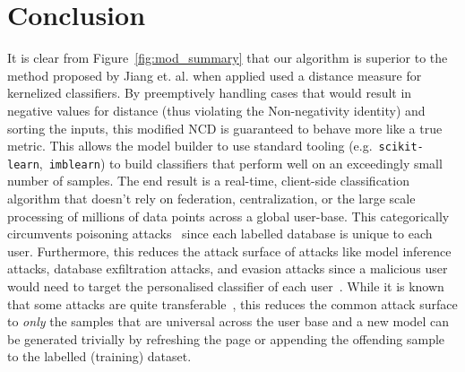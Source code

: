 \documentclass[conference]{IEEEtran}
\begin{document}
\section{Conclusion}
It is clear from Figure~\ref{fig:mod_summary} that our algorithm is superior to the method proposed by Jiang et. al. when applied used a distance measure for kernelized classifiers. By preemptively handling cases that would result in negative values for distance (thus violating the Non-negativity identity) and sorting the inputs, this modified NCD is guaranteed to behave more like a true metric. 
This allows the model builder to use standard tooling (e.g.~\texttt{scikit-learn},~\texttt{imblearn}) to build classifiers that perform well on an exceedingly small number of samples. The end result is a real-time, client-side classification algorithm that doesn't rely on federation, centralization, or the large scale processing of millions of data points across a global user-base. 
This categorically circumvents poisoning attacks~\cite{biggio_poisoning_2013} since each labelled database is unique to each user. 
Furthermore, this reduces the attack surface of attacks like model inference attacks, database exfiltration attacks, and evasion attacks since a malicious user would need to target the personalised classifier of each user~\cite{biggio_evasion_2013,deepfool,chakraborty_adversarial_2018}. 
While it is known that some attacks are quite transferable~\cite{wang2021enhancing}, this reduces the common attack surface to \textit{only} the samples that are universal across the user base and a new model can be generated trivially by refreshing the page or appending the offending sample to the labelled (training) dataset. 


\label{conclusion}



\newpage

\end{document}
